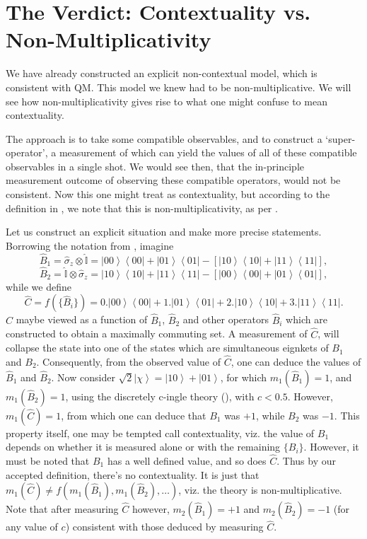 \section{The Verdict: Contextuality vs. Non-Multiplicativity}

We have already constructed an explicit non-contextual model, which
is consistent with QM. This model we knew had to be non-multiplicative.
We will see how non-multiplicativity gives rise to what one might
confuse to mean contextuality. 

The approach is to take some compatible observables, and to construct
a `super-operator', a measurement of which can yield the values of
all of these compatible observables in a single shot. We would see
then, that the in-principle measurement outcome of observing these
compatible operators, would not be consistent. Now this one might
treat as contextuality, but according to the definition in ,
we note that this is non-multiplicativity, as per .

Let us construct an explicit situation and make more precise statements.
Borrowing the notation from , imagine
\[
\hat{B}_{1}=\hat{\sigma}_{z}\otimes\hat{\mathbb{I}}=\left|00\right\rangle \left\langle 00\right|+\left|01\right\rangle \left\langle 01\right|-\left[\left|10\right\rangle \left\langle 10\right|+\left|11\right\rangle \left\langle 11\right|\right],
\]
\[
\hat{B}_{2}=\hat{\mathbb{I}}\otimes\hat{\sigma}_{z}=\left|10\right\rangle \left\langle 10\right|+\left|11\right\rangle \left\langle 11\right|-\left[\left|00\right\rangle \left\langle 00\right|+\left|01\right\rangle \left\langle 01\right|\right],
\]
while we define 
\[
\hat{C}=f(\{\hat{B}_{i}\})=0.\left|00\right\rangle \left\langle 00\right|+1.\left|01\right\rangle \left\langle 01\right|+2.\left|10\right\rangle \left\langle 10\right|+3.\left|11\right\rangle \left\langle 11\right|.
\]
$\hat{C}$ maybe viewed as a function of $\hat{B}_{1}$, $\hat{B}_{2}$
and other operators $\hat{B}_{i}$ which are constructed to obtain
a maximally commuting set. A measurement of $\hat{C}$, will collapse
the state into one of the states which are simultaneous eignkets of
$B_{1}$ and $B_{2}$. Consequently, from the observed value of $\hat{C}$,
one can deduce the values of $\hat{B}_{1}$ and $\hat{B}_{2}$. Now
consider $\sqrt{2}\left|\chi\right\rangle =\left|10\right\rangle +\left|01\right\rangle $,
for which $m_{1}(\hat{B}_{1})=1$, and $m_{1}(\hat{B}_{2})=1$, using
the discretely c-ingle theory (),
with $c<0.5$. However, $m_{1}(\hat{C})=1$, from which one can deduce
that $B_{1}$ was $+1$, while $B_{2}$ was $-1$. This property itself,
one may be tempted call contextuality, viz. the value of $B_{1}$
depends on whether it is measured alone or with the remaining $\{B_{i}\}$.
However, it must be noted that $B_{1}$ has a well defined value,
and so does $\hat{C}$. Thus by our accepted definition, there's no
contextuality. It is just that $m_{1}(\hat{C})\neq f(m_{1}(\hat{B}_{1}),m_{1}(\hat{B}_{2}),\dots)$,
viz. the theory is non-multiplicative. Note that after measuring $\hat{C}$
however, $m_{2}(\hat{B}_{1})=+1$ and $m_{2}(\hat{B}_{2})=-1$ (for
any value of $c$) consistent with those deduced by measuring $\hat{C}$.



